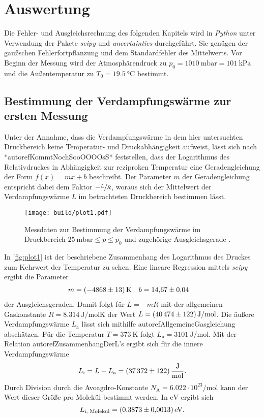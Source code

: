 \section{Auswertung}
\label{sec:Auswertung}
Die Fehler- und Ausgleichsrechnung des folgenden Kapitels wird in \textit{Python} unter Verwendung der Pakete \textit{scipy} \cite{scipy} und \textit{uncertainties}
\cite{uncertainties} durchgeführt. Sie genügen der gaußschen Fehlerfortpflanzung und dem Standardfehler des Mittelwerts.  
Vor Beginn der Messung wird der Atmosphärendruck zu $p_0 = \qty{1010}{\milli\bar} = \qty{101}{\kilo\pascal}$ und die Außentemperatur zu 
$T_0 = \qty{19.5}{\degreeCelsius}$ bestimmt.

\subsection{Bestimmung der Verdampfungswärme zur ersten Messung}
\label{subsec:A_L_Bestimmung}
Unter der Annahme, dass die Verdampfungswärme in dem hier untersuchten Druckbereich keine Temperatur- und Druckabhängigkeit aufweist, lässt sich nach *autoref{KommtNochSooOOOOsS}*
feststellen, dass der Logarithmus des Relativdruckes in Abhängigkeit zur reziproken Temperatur eine Geradengleichung der Form $f(x) = mx + b$ beschreibt. 
Der Parameter $m$ der Geradengleichung entspricht dabei dem Faktor $-\sfrac{L}{R}$, woraus sich der Mittelwert der Verdampfungswärme $L$ im betrachteten Druckbereich bestimmen lässt.

\begin{figure}
    \centering
    \texttt{[image: build/plot1.pdf]}
    \caption{Messdaten zur Bestimmung der Verdampfungswärme im Druckbereich $\qty{25}{\milli\bar} \leq p \leq p_0$ und zugehörige Ausgleichsgerade \cite{matplotlib}.}
    \label{fig:plot1}
\end{figure}

In \autoref{fig:plot1} ist der beschriebene Zusammenhang des Logarithmus des Druckes zum Kehrwert der Temperatur zu sehen. Eine lineare Regression mittels \textit{scipy} 
\cite{scipy} ergibt die Parameter
\begin{align*}
    m &= \qty{-4868 +- 13}{\kelvin} & b &= \num{14.67 +- 0.04}
\end{align*}
der Ausgleichsgeraden. Damit folgt für $L = -mR$ mit der allgemeinen Gaskonstante $R = \qty{8.314}{\joule\per\mol\kelvin}$ \cite{scipy} der Wert 
$L = \qty{40474 +- 122}{\joule\per\mol}$. Die äußere Verdampfungswärme $L_\text{a}$ lässt sich mithilfe autoref{AllgemeineGasgleichung} abschätzen. Für die Temperatur
$T = \qty{373}{\kelvin}$ folgt $L_\text{a} = \qty{3101}{\joule\per\mol}$. Mit der Relation autoref{ZusammenhangDerL's} ergibt sich für die innere Verdampfungswärme
\begin{equation*}
    L_\text{i} = L - L_\text{a} = \qty{37372+-122}{\joule\per\mol}.
\end{equation*}
Durch Division durch die Avoagdro-Konstante $N_\text{A} = 6.022 \cdot 10^23 \unit{\per\mol}$ \cite{scipy} kann der Wert dieser Größe pro Molekül bestimmt werden.
In $\unit{\electronvolt}$ ergibt sich
\begin{equation*}
    L_\text{i, Molekül} = \qty{0.3873+- 0.0013}{\electronvolt}.
\end{equation*}

